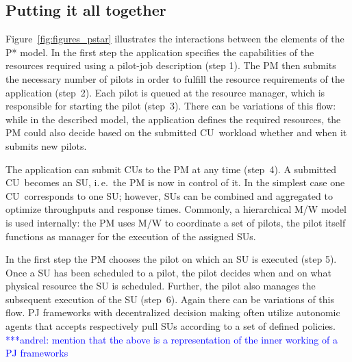 \documentclass[conference,final]{IEEEtran}
\newcommand{\alnote}[1]{ {\textcolor{blue} { ***andrel: #1 }}}
\newcommand{\alnote}[1]{}
\newcommand{\cu}{CU\xspace}
\newcommand{\cus}{CUs\xspace}
\begin{document}
\subsection{Putting it all together} 
Figure~\ref{fig:figures_pstar}
illustrates the interactions between the elements of the P* model. In
the first step the application specifies the capabilities of the
resources required using a pilot-job description (step 1). The PM then
submits the necessary number of pilots in order to fulfill the
resource requirements of the application (step~2). Each pilot is
queued at the resource manager, which is responsible for starting the
pilot (step~3). There can be variations of this flow: while in the
described model, the application defines the required resources, the
PM could also decide based on the submitted \cu \ workload whether and
when it submits new pilots.

The application can submit \cus to the PM at any time (step~4). A
submitted \cu \ becomes an SU, i.\,e.\ the PM is now in control of it. In
the simplest case one \cu \ corresponds to one SU; however, SUs can be
combined and aggregated to optimize throughputs and response
times. Commonly, a hierarchical M/W model is used internally: the PM
uses M/W to coordinate a set of pilots, the pilot itself functions as
manager for the execution of the assigned SUs.

In the first step the PM chooses the pilot on which an SU is executed
(step 5). Once a SU has been scheduled to a pilot, the pilot decides
when and on what physical resource the SU is scheduled. Further, the
pilot also manages the subsequent execution of the SU (step~6).  Again
there can be variations of this flow. PJ frameworks with decentralized
decision making often utilize autonomic agents that accepts
respectively pull SUs according to a set of defined policies.
\alnote{mention that the above is a representation of the inner working of a PJ
frameworks}
\end{document}
